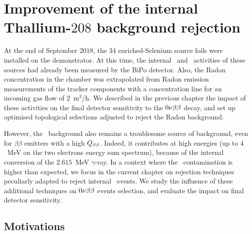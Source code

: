 \chapter{Improvement of the internal Thallium-$208$ background rejection}
\label{ch:timediff}

At the end of September $2018$, the $34$ enriched-Selenium source foils were installed on the demonstrator.
At this time, the internal \Tl\ and \Bi\ activities of these sources had already been measured by the BiPo detector.
Also, the Radon concentration in the chamber was extrapolated from Radon emission measurements of the tracker components with a concentration line for an incoming gas flow of $2$~m$^{3}$/h.
We described in the previous chapter the impact of these activities on the final detector sensitivity to the $0\nu\beta\beta$ decay, and set up optimised topological selections adjusted to reject the Radon background.

However, the \Tl\ background also remains a troublesome source of background, even for $\beta\beta$ emitters with a high $Q_{\beta\beta}$.
Indeed, it contributes at high energies (up to $4$~MeV on the two electrons energy sum spectrum), because of the internal conversion of the $2.615$~MeV $\gamma$-ray.
In a context where the \Tl\ contamination is higher than expected, we focus in the current chapter on rejection techniques peculiarly adapted to reject internal \Tl\ events.
We study the influence of these additional techniques on $0\nu\beta\beta$ events selection, and evaluate the impact on final detector sensitivity.

\section{Motivations}

